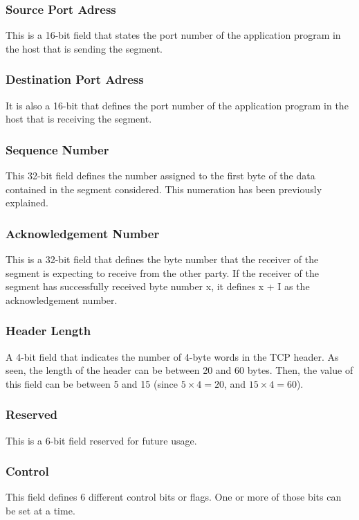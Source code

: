 \subsubsection*{Source Port Adress}
This is a 16-bit field that states the port number of the application program in the host that is sending the segment. 

\subsubsection*{Destination Port Adress}
It is also a 16-bit that defines the port number of the application program in the host that is receiving the segment. 

\subsubsection*{Sequence Number}
This 32-bit field defines the number assigned to the first byte of the data contained in the segment considered. This numeration has been previously explained.

\subsubsection*{Acknowledgement Number}
This is a 32-bit field that defines the byte number that the receiver of the segment is expecting to receive from the other party. If the receiver of the segment has successfully received byte number x, it defines x + I as the acknowledgement number. 

\subsubsection*{Header Length}
A 4-bit field that indicates the number of 4-byte words in the TCP header. As seen, the length of the header can be between 20 and 60 bytes. Then, the value of this field can be between 5 and 15 (since $5\times	4=20$, and $15\times	4=60$). 

\subsubsection*{Reserved}
This is a 6-bit field reserved for future usage.

\subsubsection*{Control}
This field defines 6 different control bits or flags. One or more of those bits can be set at a time. 

